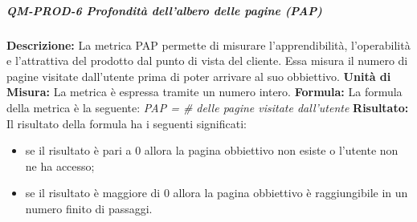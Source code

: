 			\subparagraph{QM-PROD-6 Profondità dell'albero delle pagine (PAP)}
				\textbf{Descrizione: }
					La metrica PAP permette di misurare l'apprendibilità, l'operabilità e l'attrattiva del prodotto dal punto di vista del cliente. Essa misura il numero di pagine visitate dall'utente prima di poter arrivare al suo obbiettivo.
				\textbf{Unità di Misura: }
					La metrica è espressa tramite un numero intero.
				\textbf{Formula: }
					La formula della metrica è la seguente:
					\textit{PAP = \# delle pagine visitate dall'utente}
				\textbf{Risultato: }
					Il risultato della formula ha i seguenti significati:
					\begin{itemize}
						\item se il risultato è pari a 0 allora la pagina obbiettivo non esiste o l'utente non ne ha accesso;
						\item se il risultato è maggiore di 0 allora la pagina obbiettivo è raggiungibile in un numero finito di passaggi.
					\end{itemize}

